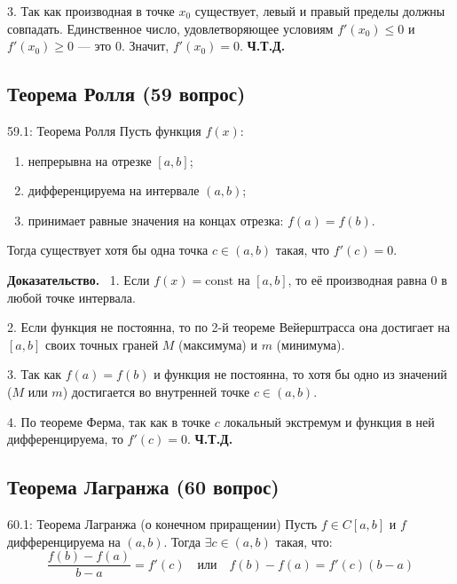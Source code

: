 \documentclass[a4paper,12pt]{article}
\newcommand{\myproof}{\textbf{Доказательство.}\ }
\begin{document}
	3. Так как производная в точке $x_0$ существует, левый и правый пределы должны совпадать. Единственное число, удовлетворяющее условиям $f'(x_0) \leq 0$ и $f'(x_0) \geq 0$ --- это $0$. Значит, $f'(x_0) = 0$. \textbf{Ч.Т.Д.}
	
	
	
	
	
	\vspace{1cm}
	\subsection{Теорема Ролля (59 вопрос)}
	
	\begin{theorembox}{59.1: Теорема Ролля}
		Пусть функция $f(x)$:
		\begin{enumerate}
			\item непрерывна на отрезке $[a, b]$;
			\item дифференцируема на интервале $(a, b)$;
			\item принимает равные значения на концах отрезка: $f(a) = f(b)$.
		\end{enumerate}
		Тогда существует хотя бы одна точка $c \in (a, b)$ такая, что $f'(c) = 0$.
	\end{theorembox}
	
	\myproof
	1. Если $f(x) = \text{const}$ на $[a, b]$, то её производная равна $0$ в любой точке интервала.
	
	2. Если функция не постоянна, то по 2-й теореме Вейерштрасса она достигает на $[a, b]$ своих точных граней $M$ (максимума) и $m$ (минимума).
	
	3. Так как $f(a) = f(b)$ и функция не постоянна, то хотя бы одно из значений ($M$ или $m$) достигается во внутренней точке $c \in (a, b)$.
	
	4. По теореме Ферма, так как в точке $c$ локальный экстремум и функция в ней дифференцируема, то $f'(c) = 0$. \textbf{Ч.Т.Д.}
	
	
	
	
	
	\subsection{Теорема Лагранжа (60 вопрос)}
	
	\begin{theorembox}{60.1: Теорема Лагранжа (о конечном приращении)}
		Пусть $f \in C[a, b]$ и $f$ дифференцируема на $(a, b)$. Тогда $\exists c \in (a, b)$ такая, что:
		$$ \frac{f(b) - f(a)}{b - a} = f'(c) \quad \text{или} \quad f(b) - f(a) = f'(c)(b - a) $$
	\end{theorembox}
	
\end{document}

